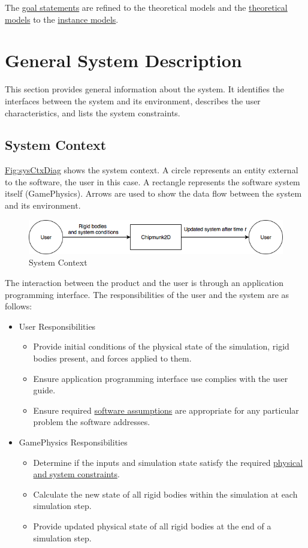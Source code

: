 \documentclass[12pt]{article}
\begin{document}
The \hyperref[Sec:GoalStmt]{goal statements} are refined to the theoretical models and the \hyperref[Sec:TMs]{theoretical models} to the \hyperref[Sec:IMs]{instance models}.

\section{General System Description}
\label{Sec:GenSysDesc}
This section provides general information about the system. It identifies the interfaces between the system and its environment, describes the user characteristics, and lists the system constraints.

\subsection{System Context}
\label{Sec:SysContext}
\hyperref[Figure:sysCtxDiag]{Fig:sysCtxDiag} shows the system context. A circle represents an entity external to the software, the user in this case. A rectangle represents the software system itself (GamePhysics). Arrows are used to show the data flow between the system and its environment.

\begin{figure}[H]
\begin{center}
\includegraphics[width=\textwidth]{../../../../datafiles/gamephysics/sysctx.png}
\caption{System Context}
\label{Figure:sysCtxDiag}
\end{center}
\end{figure}
The interaction between the product and the user is through an application programming interface. The responsibilities of the user and the system are as follows:

\begin{itemize}
\item{User Responsibilities}
\begin{itemize}
\item{Provide initial conditions of the physical state of the simulation, rigid bodies present, and forces applied to them.}
\item{Ensure application programming interface use complies with the user guide.}
\item{Ensure required \hyperref[Sec:Assumps]{software assumptions} are appropriate for any particular problem the software addresses.}
\end{itemize}
\item{GamePhysics Responsibilities}
\begin{itemize}
\item{Determine if the inputs and simulation state satisfy the required \hyperref[Sec:DataConstraints]{physical and system constraints}.}
\item{Calculate the new state of all rigid bodies within the simulation at each simulation step.}
\item{Provide updated physical state of all rigid bodies at the end of a simulation step.}
\end{itemize}
\end{itemize}
\end{document}
